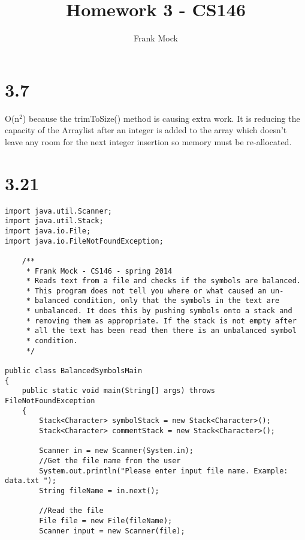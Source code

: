 \documentclass[12pt,letterpaper]{article}
\title{Homework 3 - CS146}
\author{Frank Mock}
\begin{document}
\maketitle
\vspace*{1 in}
\section*{3.7}
O(n$^2$) because the trimToSize() method is causing extra work. It is reducing the capacity of the Arraylist after an integer is added to the array which doesn't leave any room for the next integer insertion so memory must be re-allocated.
\newpage
\section*{3.21}
\scriptsize
\begin{verbatim}
import java.util.Scanner;
import java.util.Stack;
import java.io.File;
import java.io.FileNotFoundException;

	/**
	 * Frank Mock - CS146 - spring 2014
	 * Reads text from a file and checks if the symbols are balanced.
	 * This program does not tell you where or what caused an un-
	 * balanced condition, only that the symbols in the text are
	 * unbalanced. It does this by pushing symbols onto a stack and
	 * removing them as appropriate. If the stack is not empty after
	 * all the text has been read then there is an unbalanced symbol
	 * condition.
	 */

public class BalancedSymbolsMain
{	
    public static void main(String[] args) throws FileNotFoundException
    {
        Stack<Character> symbolStack = new Stack<Character>();
        Stack<Character> commentStack = new Stack<Character>();
		
        Scanner in = new Scanner(System.in);
        //Get the file name from the user
        System.out.println("Please enter input file name. Example: data.txt ");
        String fileName = in.next();
		
        //Read the file
        File file = new File(fileName);
        Scanner input = new Scanner(file);
        

\end{verbatim}
\end{document}
